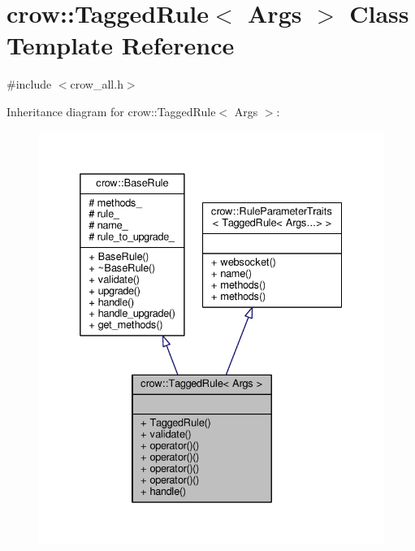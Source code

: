 \hypertarget{classcrow_1_1_tagged_rule}{\section{crow\-:\-:Tagged\-Rule$<$ Args $>$ Class Template Reference}
\label{classcrow_1_1_tagged_rule}
}


{\ttfamily \#include $<$crow\-\_\-all.\-h$>$}



Inheritance diagram for crow\-:\-:Tagged\-Rule$<$ Args $>$\-:
\nopagebreak
\begin{figure}[H]
\begin{center}
\leavevmode
\includegraphics[width=332pt]{classcrow_1_1_tagged_rule__inherit__graph}
\end{center}
\end{figure}


